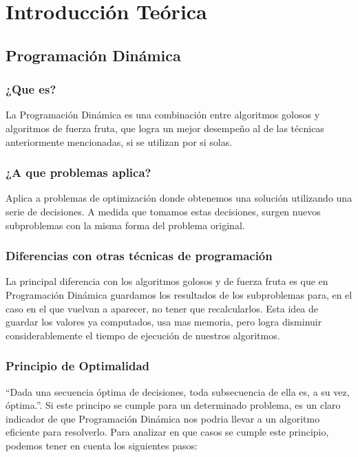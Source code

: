 \section{Introducción Teórica}

\subsection{Programación Dinámica}

\subsubsection{¿Que es?}
\indent La Programación Dinámica es una combinación entre algoritmos golosos y algoritmos de fuerza fruta, que logra un mejor desempeño al de las técnicas anteriormente mencionadas, si se utilizan por si solas.

\subsubsection{¿A que problemas aplica?}
\indent Aplica a problemas de optimización donde obtenemos una solución utilizando una serie de decisiones. A medida que tomamos estas decisiones, surgen nuevos subproblemas con la misma forma del problema original.

\subsubsection{Diferencias con otras técnicas de programación}
\indent La principal diferencia con los algoritmos golosos y de fuerza fruta es que en Programación Dinámica guardamos los resultados de los subproblemas para, en el caso en el que vuelvan a aparecer, no tener que recalcularlos. Esta idea de guardar los valores ya computados, usa mas memoria, pero logra disminuir considerablemente el tiempo de ejecución de nuestros algoritmos.

\subsubsection{Principio de Optimalidad}
\indent ``Dada una secuencia óptima de decisiones, toda subsecuencia de ella es, a su vez, óptima.''. Si este principo se cumple para un determinado problema, es un claro indicador de que Programación Dinámica nos podria llevar a un algoritmo eficiente para resolverlo. Para analizar en que casos se cumple este principio, podemos tener en cuenta los siguientes pasos:


